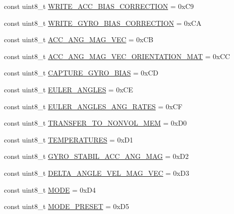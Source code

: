 \begin{DoxyCompactItemize}
\item 
const uint8\-\_\-t \hyperlink{namespace_u_s_u_a16dfbf07cc906050d4685de10f84c3d8}{\-W\-R\-I\-T\-E\-\_\-\-A\-C\-C\-\_\-\-B\-I\-A\-S\-\_\-\-C\-O\-R\-R\-E\-C\-T\-I\-O\-N} = 0x\-C9
\item 
const uint8\-\_\-t \hyperlink{namespace_u_s_u_a7e0bd6ee510ca1a1aded8b277a6c5c6a}{\-W\-R\-I\-T\-E\-\_\-\-G\-Y\-R\-O\-\_\-\-B\-I\-A\-S\-\_\-\-C\-O\-R\-R\-E\-C\-T\-I\-O\-N} = 0x\-C\-A
\item 
const uint8\-\_\-t \hyperlink{namespace_u_s_u_ad03e7c0f41fd47a68a9f33abde73932a}{\-A\-C\-C\-\_\-\-A\-N\-G\-\_\-\-M\-A\-G\-\_\-\-V\-E\-C} = 0x\-C\-B
\item 
const uint8\-\_\-t \hyperlink{namespace_u_s_u_adb9724de65ce9a212dd8611f69d241f0}{\-A\-C\-C\-\_\-\-A\-N\-G\-\_\-\-M\-A\-G\-\_\-\-V\-E\-C\-\_\-\-O\-R\-I\-E\-N\-T\-A\-T\-I\-O\-N\-\_\-\-M\-A\-T} = 0x\-C\-C
\item 
const uint8\-\_\-t \hyperlink{namespace_u_s_u_a92bab9f2a72649fb48c86fd407ef8c59}{\-C\-A\-P\-T\-U\-R\-E\-\_\-\-G\-Y\-R\-O\-\_\-\-B\-I\-A\-S} = 0x\-C\-D
\item 
const uint8\-\_\-t \hyperlink{namespace_u_s_u_a6d35ce7963dec25cc43e551dccd71453}{\-E\-U\-L\-E\-R\-\_\-\-A\-N\-G\-L\-E\-S} = 0x\-C\-E
\item 
const uint8\-\_\-t \hyperlink{namespace_u_s_u_af604e3d925c2fe95f8a6b1af3f79d2d0}{\-E\-U\-L\-E\-R\-\_\-\-A\-N\-G\-L\-E\-S\-\_\-\-A\-N\-G\-\_\-\-R\-A\-T\-E\-S} = 0x\-C\-F
\item 
const uint8\-\_\-t \hyperlink{namespace_u_s_u_a440c70222186b93e58fd4448cecb2ad2}{\-T\-R\-A\-N\-S\-F\-E\-R\-\_\-\-T\-O\-\_\-\-N\-O\-N\-V\-O\-L\-\_\-\-M\-E\-M} = 0x\-D0
\item 
const uint8\-\_\-t \hyperlink{namespace_u_s_u_ac5f57d308aea3cdda7c0a2ddade6996b}{\-T\-E\-M\-P\-E\-R\-A\-T\-U\-R\-E\-S} = 0x\-D1
\item 
const uint8\-\_\-t \hyperlink{namespace_u_s_u_a21b21aa9bf4f65bb8f89f61c853b0d65}{\-G\-Y\-R\-O\-\_\-\-S\-T\-A\-B\-I\-L\-\_\-\-A\-C\-C\-\_\-\-A\-N\-G\-\_\-\-M\-A\-G} = 0x\-D2
\item 
const uint8\-\_\-t \hyperlink{namespace_u_s_u_a18e6e53c69e61c3538c351bb86c77629}{\-D\-E\-L\-T\-A\-\_\-\-A\-N\-G\-L\-E\-\_\-\-V\-E\-L\-\_\-\-M\-A\-G\-\_\-\-V\-E\-C} = 0x\-D3
\item 
const uint8\-\_\-t \hyperlink{namespace_u_s_u_afb689aa4352de24daaa765fd9e625ae3}{\-M\-O\-D\-E} = 0x\-D4
\item 
const uint8\-\_\-t \hyperlink{namespace_u_s_u_afc9a1298a3210c69931db151aaf35de7}{\-M\-O\-D\-E\-\_\-\-P\-R\-E\-S\-E\-T} = 0x\-D5

\end{DoxyCompactItemize}
